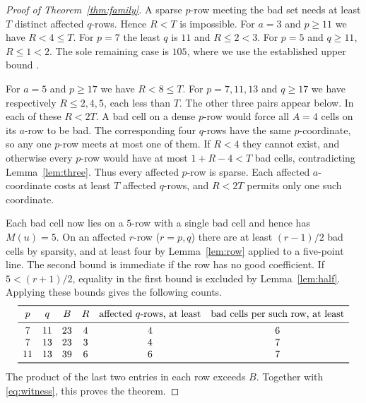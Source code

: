 \documentclass[11pt,a4paper]{article}
\begin{document}
\begin{proof}[Proof of Theorem~\ref{thm:family}]
A sparse $p$-row meeting the bad set needs at least $T$ distinct affected $q$-rows. Hence $R<T$ is impossible. For $a=3$ and $p\ge11$ we have $R<4\le T$. For $p=7$ the least $q$ is $11$ and $R\le2<3$. For $p=5$ and $q\ge11$, $R\le1<2$. The sole remaining case is $105$, where we use the established upper bound \cite{aft105}.

For $a=5$ and $p\ge17$ we have $R<8\le T$. For $p=7,11,13$ and $q\ge17$ we have respectively $R\le2,4,5$, each less than $T$. The other three pairs appear below. In each of these $R<2T$. A bad cell on a dense $p$-row would force all $A=4$ cells on its $a$-row to be bad. The corresponding four $q$-rows have the same $p$-coordinate, so any one $p$-row meets at most one of them. If $R<4$ they cannot exist, and otherwise every $p$-row would have at most $1+R-4<T$ bad cells, contradicting Lemma~\ref{lem:three}. Thus every affected $p$-row is sparse. Each affected $a$-coordinate costs at least $T$ affected $q$-rows, and $R<2T$ permits only one such coordinate.

Each bad cell now lies on a $5$-row with a single bad cell and hence has $M(u)=5$. On an affected $r$-row ($r=p,q$) there are at least $(r-1)/2$ bad cells by sparsity, and at least four by Lemma~\ref{lem:row} applied to a five-point line. The second bound is immediate if the row has no good coefficient. If $5<(r+1)/2$, equality in the first bound is excluded by Lemma~\ref{lem:half}. Applying these bounds gives the following counts.
\[
\begin{array}{cccccc}
\toprule p&q&B&R&\text{affected }q\text{-rows, at least}&\text{bad cells per such row, at least}\\
\midrule
7&11&23&4&4&6\\
7&13&23&3&4&7\\
11&13&39&6&6&7\\
\bottomrule
\end{array}
\]
The product of the last two entries in each row exceeds $B$. Together with \eqref{eq:witness}, this proves the theorem.
\end{proof}


\end{document}
